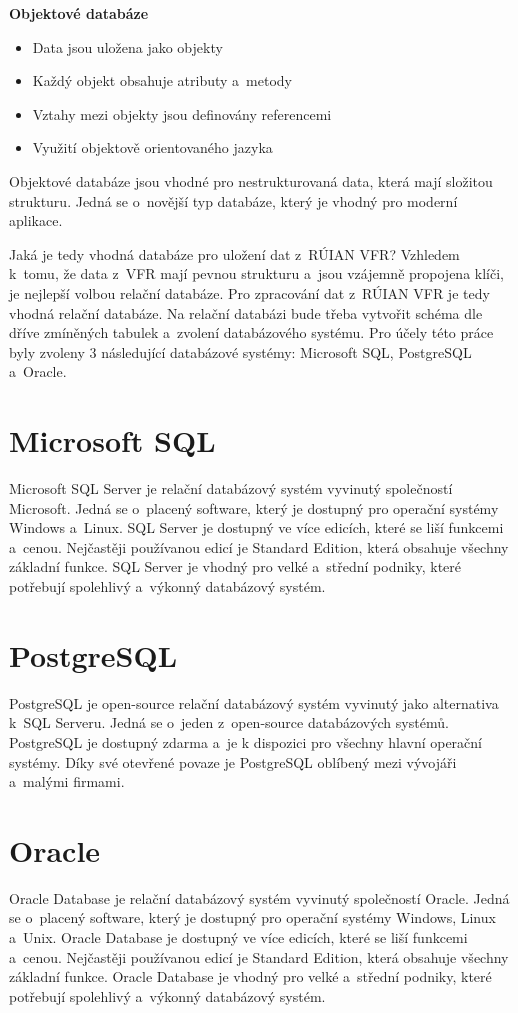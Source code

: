 \documentclass[czech, kiv, ba, he, iso690alph, pdf]{fasthesis}
\begin{document}
\textbf{Objektové databáze}
\begin{itemize}[itemsep=-2pt]
    \item Data jsou uložena jako objekty
    \item Každý objekt obsahuje atributy a~metody
    \item Vztahy mezi objekty jsou definovány referencemi
    \item Využití objektově orientovaného jazyka
\end{itemize}
Objektové databáze jsou vhodné pro nestrukturovaná data, která mají složitou strukturu.
Jedná se o~novější typ databáze, který je vhodný pro moderní aplikace.

Jaká je tedy vhodná databáze pro uložení dat z~RÚIAN VFR?
Vzhledem k~tomu, že data z~VFR mají pevnou strukturu a~jsou vzájemně propojena klíči, 
je nejlepší volbou relační databáze. Pro zpracování dat z~RÚIAN VFR je tedy vhodná relační databáze.
Na relační databázi bude třeba vytvořit schéma dle dříve zmíněných tabulek a~zvolení databázového systému.
Pro účely této práce byly zvoleny 3 následující databázové systémy: Microsoft SQL, PostgreSQL a~Oracle.
\pagebreak

\section{Microsoft SQL}
Microsoft SQL Server je relační databázový systém vyvinutý společností Microsoft.
Jedná se o~placený software, který je dostupný pro operační systémy Windows a~Linux.
SQL Server je dostupný ve více edicích, které se liší funkcemi a~cenou.
Nejčastěji používanou edicí je Standard Edition, která obsahuje všechny základní funkce.
SQL Server je vhodný pro velké a~střední podniky, které potřebují spolehlivý a~výkonný databázový systém.
\cite{microsoft_sql_server}

\section{PostgreSQL}
PostgreSQL je open-source relační databázový systém vyvinutý jako alternativa k~SQL Serveru.
Jedná se o~jeden z~open-source databázových systémů.
PostgreSQL je dostupný zdarma a~je k dispozici pro všechny hlavní operační systémy.
Díky své otevřené povaze je PostgreSQL oblíbený mezi vývojáři a~malými firmami.
\cite{postgresql}

\section{Oracle}
Oracle Database je relační databázový systém vyvinutý společností Oracle.
Jedná se o~placený software, který je dostupný pro operační systémy Windows, Linux a~Unix.
Oracle Database je dostupný ve více edicích, které se liší funkcemi a~cenou.
Nejčastěji používanou edicí je Standard Edition, která obsahuje všechny základní funkce.
Oracle Database je vhodný pro velké a~střední podniky, které potřebují spolehlivý a~výkonný databázový systém.
\cite{oracle_database}
\end{document}
